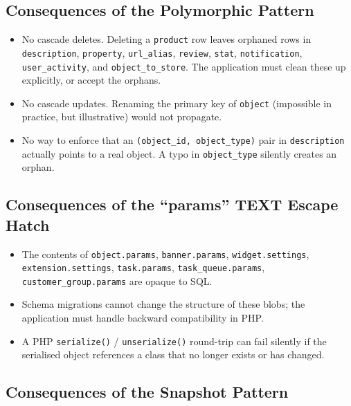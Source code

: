 \documentclass[11pt,a4paper]{article}
\begin{document}
\subsection{Consequences of the Polymorphic Pattern}

\begin{itemize}[leftmargin=1.6em,itemsep=2pt]
  \item No cascade deletes. Deleting a \texttt{product} row
        leaves orphaned rows in \texttt{description},
        \texttt{property}, \texttt{url\_alias}, \texttt{review},
        \texttt{stat}, \texttt{notification},
        \texttt{user\_activity}, and \texttt{object\_to\_store}.
        The application must clean these up explicitly, or
        accept the orphans.
  \item No cascade updates. Renaming the primary key of
        \texttt{object} (impossible in practice, but
        illustrative) would not propagate.
  \item No way to enforce that an \texttt{(object\_id,
        object\_type)} pair in \texttt{description} actually
        points to a real object. A typo in
        \texttt{object\_type} silently creates an orphan.
\end{itemize}

\subsection{Consequences of the ``params'' TEXT Escape Hatch}

\begin{itemize}[leftmargin=1.6em,itemsep=2pt]
  \item The contents of \texttt{object.params},
        \texttt{banner.params}, \texttt{widget.settings},
        \texttt{extension.settings}, \texttt{task.params},
        \texttt{task\_queue.params},
        \texttt{customer\_group.params} are opaque to SQL.
  \item Schema migrations cannot change the structure of these
        blobs; the application must handle backward
        compatibility in PHP.
  \item A PHP \texttt{serialize()} / \texttt{unserialize()}
        round-trip can fail silently if the serialised object
        references a class that no longer exists or has
        changed.
\end{itemize}

\subsection{Consequences of the Snapshot Pattern}
\end{document}
